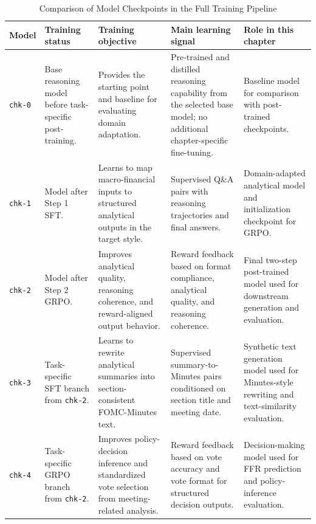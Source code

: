 \begin{table}[htbp]
    \centering
    \footnotesize
    \setlength{\tabcolsep}{4pt}
    \renewcommand{\arraystretch}{1.15}
    \begin{tabularx}{\textwidth}{@{}p{}p{}XXX@{}}
        \toprule
        \textbf{Model} & \textbf{Training status} & \textbf{Training objective} & \textbf{Main learning signal} & \textbf{Role in this chapter} \\
        \midrule
        \texttt{chk-0} & Base reasoning model before task-specific post-training. & Provides the starting point and baseline for evaluating domain adaptation. & Pre-trained and distilled reasoning capability from the selected base model; no additional chapter-specific fine-tuning. & Baseline model for comparison with post-trained checkpoints. \\
        \texttt{chk-1} & Model after Step 1 SFT. & Learns to map macro-financial inputs to structured analytical outputs in the target style. & Supervised Q\&A pairs with reasoning trajectories and final answers. & Domain-adapted analytical model and initialization checkpoint for GRPO. \\
        \texttt{chk-2} & Model after Step 2 GRPO. & Improves analytical quality, reasoning coherence, and reward-aligned output behavior. & Reward feedback based on format compliance, analytical quality, and reasoning coherence. & Final two-step post-trained model used for downstream generation and evaluation. \\
        \texttt{chk-3} & Task-specific SFT branch from \texttt{chk-2}. & Learns to rewrite analytical summaries into section-consistent FOMC-Minutes text. & Supervised summary-to-Minutes pairs conditioned on section title and meeting date. & Synthetic text generation model used for Minutes-style rewriting and text-similarity evaluation. \\
        \texttt{chk-4} & Task-specific GRPO branch from \texttt{chk-2}. & Improves policy-decision inference and standardized vote selection from meeting-related analysis. & Reward feedback based on vote accuracy and vote format for structured decision outputs. & Decision-making model used for FFR prediction and policy-inference evaluation. \\
        \bottomrule
    \end{tabularx}
    \caption{Comparison of Model Checkpoints in the Full Training Pipeline}
    \label{tab:ch2:model_checkpoints}
\end{table}




